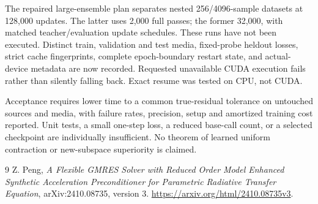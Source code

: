 \documentclass[11pt]{article}
\begin{document}
The repaired large-ensemble plan separates nested 256/4096-sample datasets at
128,000 updates. The latter uses 2,000 full passes; the former 32,000, with
matched teacher/evaluation update schedules. These runs have not been executed.
Distinct train, validation and test media, fixed-probe heldout losses, strict
cache fingerprints, complete epoch-boundary restart state, and actual-device
metadata are now recorded. Requested unavailable CUDA execution fails rather
than silently falling back. Exact resume was tested on CPU, not CUDA.

Acceptance requires lower time to a common true-residual tolerance on untouched
sources and media, with failure rates, precision, setup and amortized training
cost reported. Unit tests, a small one-step loss, a reduced base-call count,
or a selected checkpoint are individually insufficient. No theorem of learned
uniform contraction or new-subspace superiority is claimed.

\begin{thebibliography}{9}
 Z. Peng, \emph{A Flexible GMRES Solver with Reduced Order Model
Enhanced Synthetic Acceleration Preconditioner for Parametric Radiative Transfer
Equation}, arXiv:2410.08735, version 3.
\url{https://arxiv.org/html/2410.08735v3}.
\end{thebibliography}
\end{document}
